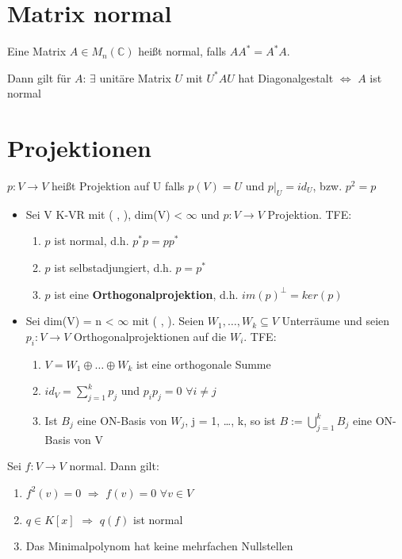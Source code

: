 \section{Matrix normal}
\begin{definition}
Eine Matrix $A \in M_n(\mathbb{C})$ heißt normal, falls $AA^* = A^*A$.
\end{definition}
\begin{lemma}
Dann gilt für $A$: $\exists$ unitäre Matrix $U$ mit $U^*AU$ hat Diagonalgestalt $\Leftrightarrow$ $A$ ist normal
\end{lemma}

\section{Projektionen}
\begin{definition}
$p: V \to V$ heißt Projektion auf U falls $p(V) = U$ und $p|_U = id_U$, bzw. $p^2 = p$
\end{definition}

\begin{theorem}
\leavevmode
\begin{itemize}
\item Sei V K-VR mit ( , ), dim(V) < $\infty$ und $p: V \to V$ Projektion. TFE:
\begin{enumerate}
\item $p$ ist normal, d.h. $p^*p = pp^*$
\item $p$ ist selbstadjungiert, d.h. $p = p^*$
\item $p$ ist eine \textbf{Orthogonalprojektion}, d.h. $im(p)^\perp = ker(p)$
\end{enumerate}
\item Sei dim(V) = n < $\infty$ mit ( , ). Seien $W_1, …, W_k \subseteq V$ Unterräume und seien $p_i: V \to V$ Orthogonalprojektionen auf die $W_i$. TFE:
\begin{enumerate}
\item $V = W_1 \oplus … \oplus W_k$ ist eine orthogonale Summe
\item $id_V = \sum\limits_{j=1}^k p_j$ und $p_ip_j = 0$ $\forall i \neq j$
\item Ist $B_j$ eine ON-Basis von $W_j$, j = 1, …, k, so ist $B := \bigcup\limits_{j=1}^k B_j$ eine ON-Basis von V 
\end{enumerate}
\end{itemize}
\end{theorem}

\begin{lemma}
Sei $f: V \to V$ normal. Dann gilt:
\begin{enumerate}
	\item $f^2(v) = 0$ $\Rightarrow$ $f(v) = 0$ $\forall v \in V$
	\item $q \in K[x]$ $\Rightarrow$ $q(f)$ ist normal
	\item Das Minimalpolynom hat keine mehrfachen Nullstellen
\end{enumerate}
\end{lemma}

